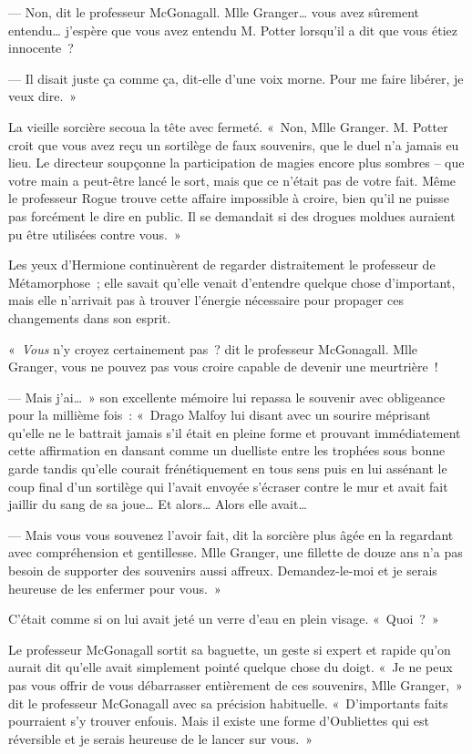 --- Non, dit le professeur McGonagall. Mlle Granger… vous avez sûrement entendu… j'espère que vous avez entendu M. Potter lorsqu'il a dit que vous étiez innocente~?

--- Il disait juste ça comme ça, dit-elle d'une voix morne. Pour me faire libérer, je veux dire.~»

La vieille sorcière secoua la tête avec fermeté. «~Non, Mlle Granger. M. Potter croit que vous avez reçu un sortilège de faux souvenirs, que le duel n'a jamais eu lieu. Le directeur soupçonne la participation de magies encore plus sombres -- que votre main a peut-être lancé le sort, mais que ce n'était pas de votre fait. Même le professeur Rogue trouve cette affaire impossible à croire, bien qu'il ne puisse pas forcément le dire en public. Il se demandait si des drogues moldues auraient pu être utilisées contre vous.~»

Les yeux d'Hermione continuèrent de regarder distraitement le professeur de Métamorphose~; elle savait qu'elle venait d'entendre quelque chose d'important, mais elle n'arrivait pas à trouver l'énergie nécessaire pour propager ces changements dans son esprit.

«~\emph{Vous} n'y croyez certainement pas~? dit le professeur McGonagall. Mlle Granger, vous ne pouvez pas vous croire capable de devenir une meurtrière~!

--- Mais j'ai…~» son excellente mémoire lui repassa le souvenir avec obligeance pour la millième fois~: «~Drago Malfoy lui disant avec un sourire méprisant qu'elle ne le battrait jamais s'il était en pleine forme et prouvant immédiatement cette affirmation en dansant comme un duelliste entre les trophées sous bonne garde tandis qu'elle courait frénétiquement en tous sens puis en lui assénant le coup final d'un sortilège qui l'avait envoyée s'écraser contre le mur et avait fait jaillir du sang de sa joue… Et alors… Alors elle avait…

--- Mais vous vous souvenez l'avoir fait, dit la sorcière plus âgée en la regardant avec compréhension et gentillesse. Mlle Granger, une fillette de douze ans n'a pas besoin de supporter des souvenirs aussi affreux. Demandez-le-moi et je serais heureuse de les enfermer pour vous.~»

C'était comme si on lui avait jeté un verre d'eau en plein visage. «~Quoi~?~»

Le professeur McGonagall sortit sa baguette, un geste si expert et rapide qu'on aurait dit qu'elle avait simplement pointé quelque chose du doigt. «~Je ne peux pas vous offrir de vous débarrasser entièrement de ces souvenirs, Mlle Granger,~» dit le professeur McGonagall avec sa précision habituelle. «~D'importants faits pourraient s'y trouver enfouis. Mais il existe une forme d'Oubliettes qui est réversible et je serais heureuse de le lancer sur vous.~»

